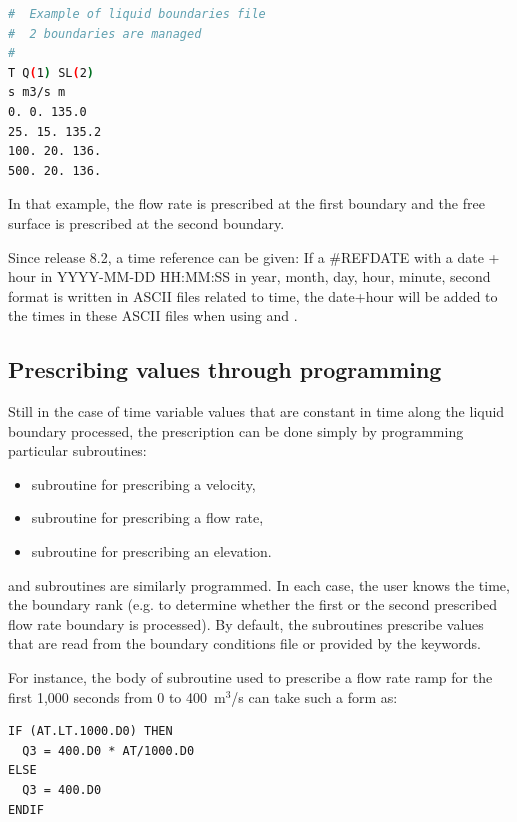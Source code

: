 \begin{lstlisting}[language=bash]
#  Example of liquid boundaries file
#  2 boundaries are managed
#
T Q(1) SL(2)
s m3/s m
0. 0. 135.0
25. 15. 135.2
100. 20. 136.
500. 20. 136.
\end{lstlisting}

In that example, the flow rate is prescribed at the first boundary and the free
surface is prescribed at the second boundary.

Since release 8.2, a time reference can be given:
If a \#REFDATE with a date + hour in YYYY-MM-DD HH:MM:SS
in year, month, day, hour, minute, second format is written in ASCII files
related to time,
the date+hour will be added to the times in these ASCII files
when using  and .

\subsection{Prescribing values through programming}

Still in the case of time variable values that are constant in time along the
liquid boundary processed, the prescription can be done simply by programming
particular subroutines:

\begin{itemize}
\item {} subroutine for prescribing a velocity,

\item {} subroutine for prescribing a flow rate,

\item {} subroutine for prescribing an elevation.
\end{itemize}

 and  subroutines are similarly programmed.
In each case, the user knows the time, the boundary rank (e.g. to determine
whether the first or the second prescribed flow rate boundary is processed).
By default, the subroutines prescribe values that are read from the boundary
conditions file or provided by the keywords.

For instance, the body of subroutine  used to prescribe a flow rate
ramp for the first 1,000 seconds from 0 to 400~m${}^{3}$/s can take such a form as:

\begin{lstlisting}[language=TelFortran]
IF (AT.LT.1000.D0) THEN
  Q3 = 400.D0 * AT/1000.D0
ELSE
  Q3 = 400.D0
ENDIF
\end{lstlisting}

